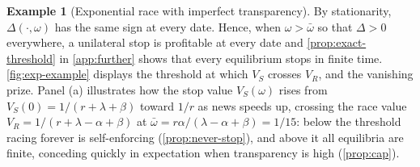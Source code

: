 \documentclass[12pt,reqno]{article}
\theoremstyle{definition} \newtheorem{example}{Example}
\theoremstyle{definition} \newtheorem{condition}{Condition}
\theoremstyle{definition} \newtheorem{corollary}{Corollary}
\theoremstyle{definition} \newtheorem{claim}{Claim}
\theoremstyle{definition} \newtheorem{definition}{Definition}
\theoremstyle{definition} \newtheorem{conjecture}{Conjecture}
\theoremstyle{definition} \newtheorem{Lemma}{Lemma}
\theoremstyle{definition} \newtheorem{lemma}{Lemma}
\theoremstyle{plain} \newtheorem{theorem}{Theorem}
\theoremstyle{definition} \newtheorem{assumption}{Assumption}
\theoremstyle{definition} \newtheorem*{assumptionnonumber}{Assumption}
\theoremstyle{definition} \newtheorem*{theoremNoNumber}{Proposition}
\theoremstyle{definition}
\theoremstyle{definition}\newtheorem{proposition}{Proposition}
\theoremstyle{definition} \newtheorem{result}{Result}
\theoremstyle{definition} \newtheorem*{definitionNoNumber}{Definition}
\theoremstyle{definition} \newtheorem{Definition}{Definition}
\theoremstyle{definition} \newtheorem*{DefinitionNoNumber}{Definition}
\theoremstyle{definition} \newtheorem*{fact}{Fact}
\theoremstyle{definition} \newtheorem*{property}{Property}
\theoremstyle{definition} \newtheorem{remark}{Remark}
\begin{document}
\begin{example}[Exponential race with imperfect transparency]
By stationarity, $\Delta(\cdot,\omega)$ has the same sign at every
date. Hence, when $\omega>\bar\omega$ so that $\Delta>0$ everywhere,
a unilateral stop is profitable at every date and
\cref{prop:exact-threshold} in \cref{app:further} shows that every
equilibrium stops in finite time. \cref{fig:exp-example} displays the  threshold at which $V_S$ crosses $V_R$, and the vanishing prize. Panel (a) illustrates how the stop value $V_S(\omega)$ rises from $V_S(0)=1/(r+\lambda+\beta)$ toward $1/r$ as news speeds up, crossing the race value $V_R=1/(r+\lambda-\alpha+\beta)$ at $\bar\omega=r\alpha/(\lambda-\alpha+\beta)=1/15$: below the threshold racing forever is self-enforcing (\cref{prop:never-stop}), and above it all equilibria are finite, conceding quickly in expectation when transparency is high (\cref{prop:cap}). 



\end{example}
\end{document}
